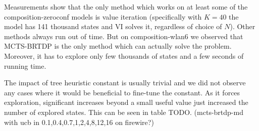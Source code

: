 Measurements show that the only method which works on at least some of the
composition-zeroconf models is value iteration (specifically with $K = 40$ the
model has 141 thousand states and VI solves it, regardless of choice of $N$).
Other methods always run out of time.
But on composition-wlan6 we observed that MCTS-BRTDP is the only method which
can actually solve the problem. Moreover, it has to explore only few
thousands of states and a few seconds of running time.

The impact of tree heuristic constant is usually trivial and we did not
observe any cases where it would be beneficial to fine-tune the
constant. As it forces exploration, significant increases beyond a small
useful value just increased the number of explored states. This can be
seen in table TODO. (mcts-brtdp-md with ucb in 0.1,0.4,0.7,1,2,4,8,12,16
on firewire?)

